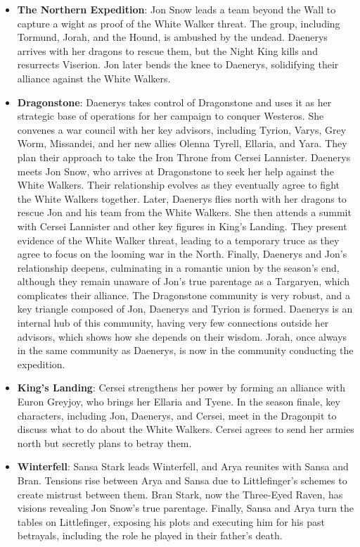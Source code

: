 \documentclass[10pt,twocolumn,letterpaper]{article}
\begin{document}
\begin{itemize}
    \item \textbf{The Northern Expedition}: Jon Snow leads a team beyond the Wall to capture a wight as proof of the White Walker threat. The group, including Tormund, Jorah, and the Hound, is ambushed by the undead. Daenerys arrives with her dragons to rescue them, but the Night King kills and resurrects Viserion. Jon later bends the knee to Daenerys, solidifying their alliance against the White Walkers.
    \item \textbf{Dragonstone}: Daenerys takes control of Dragonstone and uses it as her strategic base of operations for her campaign to conquer Westeros. She convenes a war council with her key advisors, including Tyrion, Varys, Grey Worm, Missandei, and her new allies Olenna Tyrell, Ellaria, and Yara. They plan their approach to take the Iron Throne from Cersei Lannister. Daenerys meets Jon Snow, who arrives at Dragonstone to seek her help against the White Walkers. Their relationship evolves as they eventually agree to fight the White Walkers together. Later, Daenerys flies north with her dragons to rescue Jon and his team from the White Walkers. She then attends a summit with Cersei Lannister and other key figures in King's Landing. They present evidence of the White Walker threat, leading to a temporary truce as they agree to focus on the looming war in the North. Finally, Daenerys and Jon's relationship deepens, culminating in a romantic union by the season’s end, although they remain unaware of Jon's true parentage as a Targaryen, which complicates their alliance. The Dragonstone community is very robust, and a key triangle composed of Jon, Daenerys and Tyrion is formed. Daenerys is an internal hub of this community, having very few connections outside her advisors, which shows how she depends on their wisdom. Jorah, once always in the same community as Daenerys, is now in the community conducting the expedition.
    \item \textbf{King's Landing}: Cersei strengthens her power by forming an alliance with Euron Greyjoy, who brings her Ellaria and Tyene. In the season finale, key characters, including Jon, Daenerys, and Cersei, meet in the Dragonpit to discuss what to do about the White Walkers. Cersei agrees to send her armies north but secretly plans to betray them.
    \item \textbf{Winterfell}: Sansa Stark leads Winterfell, and Arya reunites with Sansa and Bran. Tensions rise between Arya and Sansa due to Littlefinger's schemes to create mistrust between them. Bran Stark, now the Three-Eyed Raven, has visions revealing Jon Snow’s true parentage. Finally, Sansa and Arya turn the tables on Littlefinger, exposing his plots and executing him for his past betrayals, including the role he played in their father's death.
\end{itemize}
\end{document}
